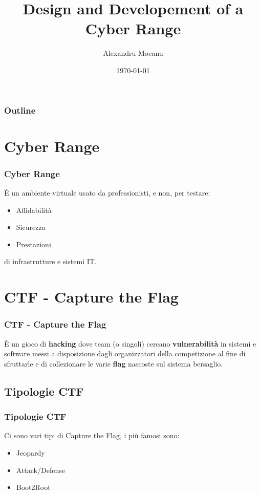 \documentclass{beamer}
\title[Cyber Range]{Design and Developement of a Cyber Range}
\author[A. Mocanu]{Alexandru Mocanu}
\institute[UniTo]{Università Degli Studi di Torino\\ Dipartimento di Informatica}
\date{\today}
\begin{document}
\begin{frame}
    \titlepage
\end{frame}

\begin{frame}
    \frametitle{Outline}

    \tableofcontents

\end{frame}

\section{Cyber Range}
\begin{frame}
    \frametitle{Cyber Range}

    È un ambiente virtuale usato da professionisti, e non, per testare:
    \begin{itemize}
        \item Affidabilità
        \item Sicurezza
        \item Prestazioni
    \end{itemize}
    di infrastrutture e sistemi IT.
\end{frame}

\section{CTF - Capture the Flag}
\begin{frame}
    \frametitle{CTF - Capture the Flag}

    È un gioco di \textbf{hacking} dove team (o singoli) cercano \textbf{vulnerabilità} in sistemi
    e software messi a disposizione dagli organizzatori della competizione al fine di sfruttarle e 
    di collezionare le varie \textbf{flag} nascoste sul sistema bersaglio.
    

\end{frame}
\subsection{Tipologie CTF}
\begin{frame}
    \frametitle{Tipologie CTF}
    Ci sono vari tipi di Capture the Flag, i più famosi sono:
    \begin{itemize}
        \item Jeopardy
        \item Attack/Defense
        \item Boot2Root
    \end{itemize}
    

\end{frame}
\end{document}
